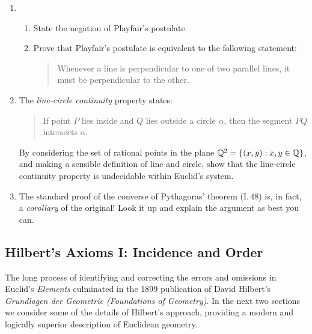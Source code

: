 \begin{exercises}
\begin{enumerate}
	  
	  \item\begin{enumerate}
	    \item State the negation of Playfair's postulate.
	    \item Prove that Playfair's postulate is equivalent to the following statement:
	  \begin{quote}
	  	Whenever a line is perpendicular to one of two parallel lines, it must be perpendicular to the other.
	  \end{quote}
	  \end{enumerate}
	 
	  
	  \item\label{ex:euclidundecideable} The \emph{line-circle continuity} property states:
	  \begin{quote}
	  If point $P$ lies inside and $Q$ lies outside a circle $\alpha$, then the segment $\overline{PQ}$ intersects $\alpha$.
	  \end{quote}
	  By considering the set of rational points in the plane $\mathbb{Q}^2=\{(x,y):x,y\in\mathbb{Q}\}$, and making a sensible definition of line and circle, show that the line-circle continuity property is undecidable within Euclid's system.
		
		
		\item The standard proof of the converse of Pythagoras' theorem (I.\,48) is, in fact, a \emph{corollary} of the original! Look it up and explain the argument as best you can.
	\end{enumerate}
	
\end{exercises}

\clearpage



\subsection{Hilbert's Axioms I: Incidence and Order}\label{sec:hilbert1}

The long process of identifying and correcting the errors and omissions in Euclid's \emph{Elements} culminated in the 1899 publication of David Hilbert's \emph{Grundlagen der Geometrie (Foundations of Geometry)}. In the next two sections we consider some of the details of Hilbert's approach, providing a modern and logically superior description of Euclidean geometry.\smallbreak

